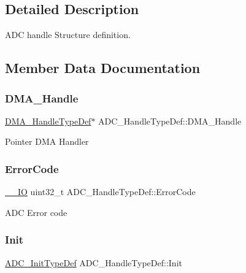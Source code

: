\subsection{Detailed Description}
A\+DC handle Structure definition. 

\subsection{Member Data Documentation}
\mbox{\label{struct_a_d_c___handle_type_def_a1983db16acacd5f0b2881e43010dcd72}} 
\subsubsection{\texorpdfstring{DMA\_Handle}{DMA\_Handle}}
{\footnotesize\ttfamily \mbox{\hyperlink{group___d_m_a___exported___types_ga41b754a906b86bce54dc79938970138b}{D\+M\+A\+\_\+\+Handle\+Type\+Def}}$\ast$ A\+D\+C\+\_\+\+Handle\+Type\+Def\+::\+D\+M\+A\+\_\+\+Handle}

Pointer D\+MA Handler \mbox{\label{struct_a_d_c___handle_type_def_a576634bdfdae8c61203a232876d2ba72}} 
\subsubsection{\texorpdfstring{ErrorCode}{ErrorCode}}
{\footnotesize\ttfamily \mbox{\hyperlink{core__sc300_8h_aec43007d9998a0a0e01faede4133d6be}{\+\_\+\+\_\+\+IO}} uint32\+\_\+t A\+D\+C\+\_\+\+Handle\+Type\+Def\+::\+Error\+Code}

A\+DC Error code \mbox{\label{struct_a_d_c___handle_type_def_a43986a9a8ff67bdb398c01db82fda605}} 
\subsubsection{\texorpdfstring{Init}{Init}}
{\footnotesize\ttfamily \mbox{\hyperlink{struct_a_d_c___init_type_def}{A\+D\+C\+\_\+\+Init\+Type\+Def}} A\+D\+C\+\_\+\+Handle\+Type\+Def\+::\+Init}

